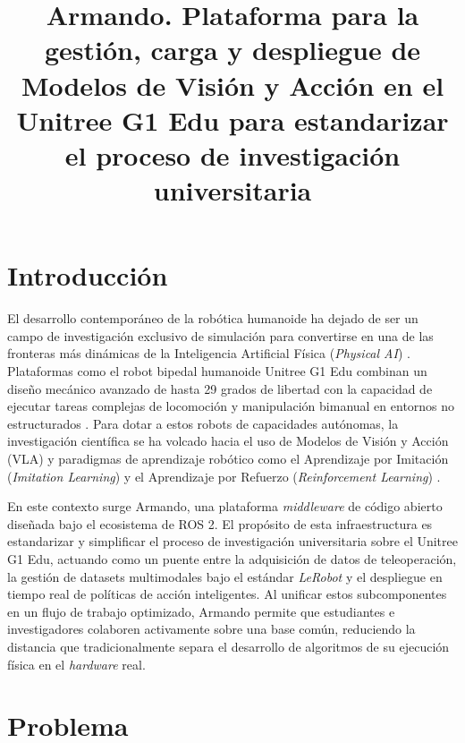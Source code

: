 \documentclass[stu,12pt,floatsintext]{apa7}
\title{Armando. Plataforma para la gestión, carga y despliegue de Modelos de Visión y Acción en el Unitree G1 Edu para estandarizar el proceso de investigación universitaria}
\begin{document}
\maketitle

\tableofcontents

\clearpage
\listoffigures

\clearpage
\listoftables
\clearpage


\printglossary[type=\acronymtype]
\clearpage

\section{Introducción}

El desarrollo contemporáneo de la robótica humanoide ha dejado de ser un campo de investigación exclusivo de simulación para convertirse en una de las fronteras más dinámicas de la Inteligencia Artificial Física (\textit{Physical AI}) \parencite{bjorck2025groot}. Plataformas como el robot bipedal humanoide Unitree G1 Edu combinan un diseño mecánico avanzado de hasta 29 grados de libertad con la capacidad de ejecutar tareas complejas de locomoción y manipulación bimanual en entornos no estructurados \parencite{yan2026rapiddeployment}. Para dotar a estos robots de capacidades autónomas, la investigación científica se ha volcado hacia el uso de Modelos de Visión y Acción (VLA) y paradigmas de aprendizaje robótico como el Aprendizaje por Imitación (\textit{Imitation Learning}) y el Aprendizaje por Refuerzo (\textit{Reinforcement Learning}) \parencite{seo2025learningsimtorealhumanoidlocomotion, yan2026rapiddeployment}.

En este contexto surge Armando, una plataforma \textit{middleware} de código abierto diseñada bajo el ecosistema de ROS 2. El propósito de esta infraestructura es estandarizar y simplificar el proceso de investigación universitaria sobre el Unitree G1 Edu, actuando como un puente entre la adquisición de datos de teleoperación, la gestión de datasets multimodales bajo el estándar \textit{LeRobot} \parencite{cadene2026lerobotopensourcelibraryendtoend} y el despliegue en tiempo real de políticas de acción inteligentes. Al unificar estos subcomponentes en un flujo de trabajo optimizado, Armando permite que estudiantes e investigadores colaboren activamente sobre una base común, reduciendo la distancia que tradicionalmente separa el desarrollo de algoritmos de su ejecución física en el \textit{hardware} real.

\section{Problema}
\end{document}
